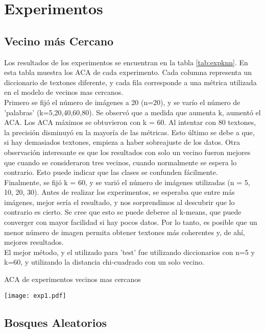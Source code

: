 \documentclass[10pt,twocolumn,letterpaper]{article}
\begin{document}
\section{Experimentos}

\subsection{Vecino más Cercano}
Los resultados de los experimentos se encuentran en la tabla \ref{tab:expknn}. En esta tabla muestra los ACA de cada experimento. Cada columna representa un diccionario de textones diferente, y cada fila corresponde a una métrica utilizada en el modelo de vecinos mas cercanos. \\
Primero se fijó el número de imágenes a 20 (n=20), y se varío el número de 'palabras' (k=5,20,40,60,80). Se observó que a medida que aumenta k, aumentó el ACA. Los ACA máximos se obtuvieron con k = 60. Al intentar con 80 textones, la precisión disminuyó en la mayoría de las métricas. Esto último se debe a que, si hay demasiados textones, empieza a haber sobreajuste de los datos. Otra observación interesante es que los resultados con solo un vecino fueron mejores que cuando se consideraron tres vecinos, cuando normalmente se espera lo contrario. Esto puede indicar que las clases se confunden fácilmente.\\
Finalmente, se fijó k = 60, y se varió el número de imágenes utilizadas (n = 5, 10, 20, 30). Antes de realizar los experimentos, se esperaba que entre más imágenes, mejor sería el resultado, y nos sorprendimos al descubrir que lo contrario es cierto. Se cree que esto se puede deberse al k-means, que puede converger con mayor facilidad si hay pocos datos. Por lo tanto, es posible que un menor número de imagen permita obtener textones más coherentes y, de ahí, mejores resultados.\\
El mejor método, y el utilizado para 'test' fue utilizando diccionarios con n=5 y k=60, y utilizando la distancia chi-cuadrado con un solo vecino.
\begin{table}[t]
   \caption{ACA de experimentos vecinos mas cercanos}
   \texttt{[image: exp1.pdf]}
\label{tab:expknn}
\end{table}

\subsection{Bosques Aleatorios}
\end{document}
